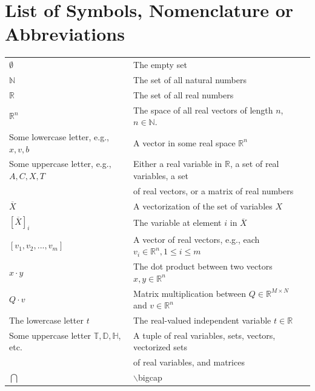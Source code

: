 \chapter*{List of Symbols, Nomenclature or
Abbreviations}  


\begin{table}[!h]
\begin{tabular}{l l r}

$\emptyset$ & The empty set \\
$\mathbb{N}$ & The set of all natural numbers \\
$\mathbb{R}$ & The set of all real numbers \\
$\mathbb{R}^n$ & The space of all real vectors of length $n$, $n \in \mathbb{N}$.  \\
Some lowercase letter, e.g., $x, v, b$ & A vector in some real space $\mathbb{R}^n$ \\
Some uppercase letter, e.g., $A, C, X, T$ & Either a real variable in $\mathbb{R}$, a set of real variables, a set \\
& of real vectors, or a matrix of real numbers \\
$\overline{X}$  & A vectorization of the set of variables $X$ \\
$[\overline{X}]_i$ & The variable at element $i$ in $\overline{X}$ \\
$[v_1, v_2, ..., v_m]$ & A vector of real vectors, e.g., each $v_i \in \mathbb{R}^n, 1 \leq i \leq m $ \\
$x \cdot y$ & The dot product between two vectors $x,y \in \mathbb{R}^n$ \\
$Q \cdot v$ & Matrix multiplication between $Q \in \mathbb{R}^{M \times N}$ and $v \in \mathbb{R}^n$ \\
The lowercase letter $t$ & The real-valued independent variable $t \in \mathbb{R}$ \\
Some uppercase letter $\mathbb{T}, \mathbb{D}, \mathbb{H}$, etc. & A tuple of real variables, sets, vectors, vectorized sets  \\
 & of real variables, and matrices \\
$\bigcap$ &$\backslash$bigcap
\end{tabular}
\end{table}
